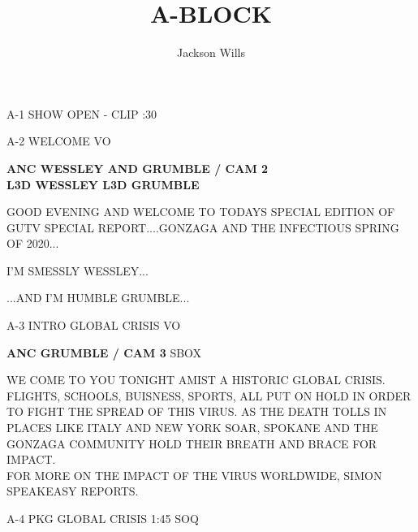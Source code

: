 \documentclass{article}
\title{A-BLOCK}
\author{Jackson Wills}
\newenvironment{changemargin}[2]{%
\begin{list}{}{%
\setlength{\topsep}{0pt}%
\setlength{\leftmargin}{#1}%
\setlength{\rightmargin}{#2}%
\setlength{\listparindent}{\parindent}%
\setlength{\itemindent}{\parindent}%
\setlength{\parsep}{\parskip}%
}%
\item[]}{\end{list}}
\begin{document}
\maketitle
\begin{flushleft}
\begin{changemargin}{-3cm}{-5cm}
\color{red}
A-1     SHOW OPEN - CLIP  :30
\vspace{5mm}

A-2      WELCOME  VO


\color{black}
\textbf{
ANC WESSLEY AND GRUMBLE / CAM 2} \\

\textbf{
L3D WESSLEY L3D GRUMBLE
}
\end{changemargin}

\begin{changemargin}{4cm}{1cm}
GOOD EVENING AND WELCOME TO TODAYS SPECIAL EDITION OF GUTV SPECIAL REPORT....GONZAGA AND THE INFECTIOUS SPRING OF 2020...

\vspace{5mm}

I'M SMESSLY WESSLEY...

\vspace{5mm}

...AND I'M HUMBLE GRUMBLE...
\end{changemargin}




\begin{changemargin}{-3cm}{-5cm}
\color{red}
A-3     INTRO GLOBAL CRISIS  VO

\color{black}

\textbf{
ANC GRUMBLE / CAM 3}
\color{red}
SBOX
\end{changemargin}

\color{black}
\begin{changemargin}{4cm}{1cm}
WE COME TO YOU TONIGHT AMIST A HISTORIC GLOBAL CRISIS. FLIGHTS, SCHOOLS, BUISNESS, SPORTS, ALL PUT ON HOLD IN ORDER TO FIGHT THE SPREAD OF THIS VIRUS. AS THE DEATH TOLLS IN PLACES LIKE ITALY AND NEW YORK SOAR, SPOKANE AND THE GONZAGA COMMUNITY HOLD THEIR BREATH AND BRACE FOR IMPACT. \\
FOR MORE ON THE IMPACT OF THE VIRUS WORLDWIDE, SIMON SPEAKEASY REPORTS.

\end{changemargin}

\begin{changemargin}{-3cm}{-5cm}
\color{red}
A-4     PKG GLOBAL CRISIS  1:45     SOQ



\end{changemargin}
\end{flushleft}
\end{document}
